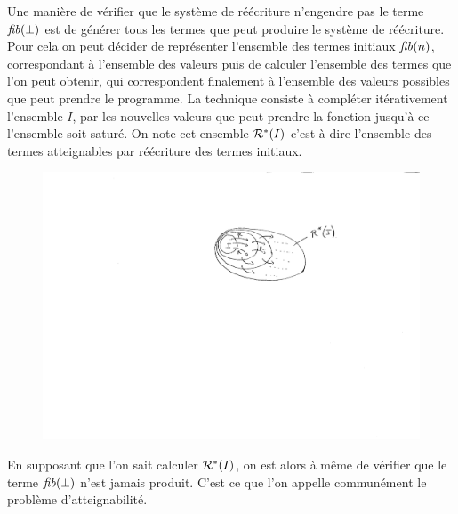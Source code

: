Une manière de vérifier que le système de réécriture n'engendre pas le terme $\mathit{fib}(\perp)$ est de générer tous les 
termes que peut produire le système de réécriture. 
Pour cela on peut décider de représenter l'ensemble des termes initiaux $\mathit{fib}(n)$, correspondant à l'ensemble des valeurs 
puis de calculer l'ensemble des termes que l'on peut obtenir, qui correspondent finalement à l'ensemble des valeurs
possibles que peut prendre le programme. La technique consiste à compléter itérativement l'ensemble $I$, 
par les nouvelles valeurs que peut prendre la fonction jusqu'à ce l'ensemble soit saturé. On note cet ensemble $\mathcal R^*(I)$
c'est à dire l'ensemble des termes atteignables par réécriture des termes initiaux.

\begin{figure}[ht!]
  \centering
  \includegraphics[width=12cm]{1_intro/exact}
\end{figure}

En supposant que l'on sait calculer $\mathcal R^*(I)$, on est alors à même de vérifier que le terme $\mathit{fib}(\perp)$
n'est jamais produit. C'est ce que l'on appelle communément le problème d'atteignabilité.

